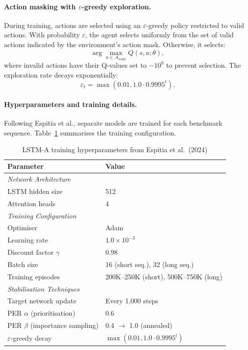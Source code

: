 \documentclass[12pt, oneside, openany]{book}
\theoremstyle{plain}
\theoremstyle{definition}
\begin{document}
\paragraph{Action masking with $\varepsilon$-greedy exploration.} During training, actions are selected using an $\varepsilon$-greedy policy restricted to valid actions. With probability $\varepsilon$, the agent selects uniformly from the set of valid actions indicated by the environment's action mask. Otherwise, it selects:
\begin{equation}
\arg\max_{a \in \mathcal{A}_{\text{valid}}} Q(s,a;\theta),
\end{equation}
where invalid actions have their Q-values set to $-10^9$ to prevent selection. The exploration rate decays exponentially:
\begin{equation}
\varepsilon_t = \max(0.01, 1.0 \cdot 0.9995^t).
\end{equation}

\paragraph{Hyperparameters and training details.} Following Espitia et al., separate models are trained for each benchmark sequence. Table~\ref{tab:lstm_hyperparameters} summarises the training configuration.

\begin{table}[htbp]
\centering
\caption{LSTM-A training hyperparameters from Espitia et al.\ (2024)}
\label{tab:lstm_hyperparameters}
\begin{tabular}{ll}
\toprule
\textbf{Parameter} & \textbf{Value} \\
\midrule
\multicolumn{2}{l}{\textit{Network Architecture}} \\
LSTM hidden size & 512 \\
Attention heads & 4 \\
\midrule
\multicolumn{2}{l}{\textit{Training Configuration}} \\
Optimiser & Adam \\
Learning rate & $1.0 \times 10^{-3}$ \\
Discount factor $\gamma$ & 0.98 \\
Batch size & 16 (short seq.), 32 (long seq.) \\
Training episodes & 200K--250K (short), 500K--750K (long) \\
\midrule
\multicolumn{2}{l}{\textit{Stabilisation Techniques}} \\
Target network update & Every 1,000 steps \\
PER $\alpha$ (prioritisation) & 0.6 \\
PER $\beta$ (importance sampling) & 0.4 $\to$ 1.0 (annealed) \\
$\varepsilon$-greedy decay & $\max(0.01, 1.0 \cdot 0.9995^t)$ \\
\bottomrule
\end{tabular}
\end{table}
\end{document}
